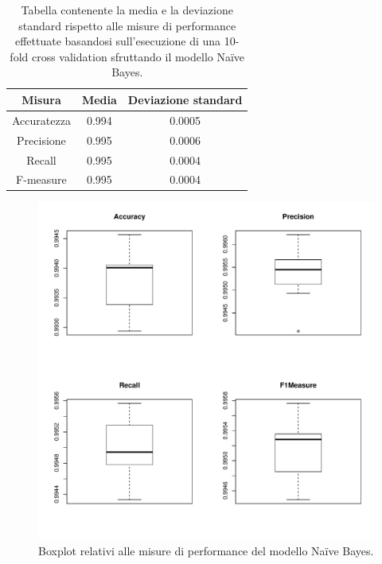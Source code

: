 \begin{table}
	\caption{Tabella contenente la media e la deviazione standard rispetto alle misure di performance effettuate basandosi sull'esecuzione di una 10-fold cross validation sfruttando il modello Na\"ive Bayes.}
	
	\label{tab:bayes_perf}
	
	\centering
	\begin{tabular}{c|cc}
		Misura & Media & Deviazione standard \\
		\hline
		Accuratezza & 0.994 & 0.0005 \\
		Precisione & 0.995 &  0.0006\\
		Recall & 0.995 & 0.0004 \\
		F-measure & 0.995 & 0.0004 \\
	\end{tabular}
\end{table} 

\begin{figure}
	\centering
	\includegraphics[width=0.7\linewidth]{../FinalResults/Bayes_performance}
	\caption{Boxplot relativi alle misure di performance del modello Na\"ive Bayes.}
	\label{fig:bayesperformance}
\end{figure}


